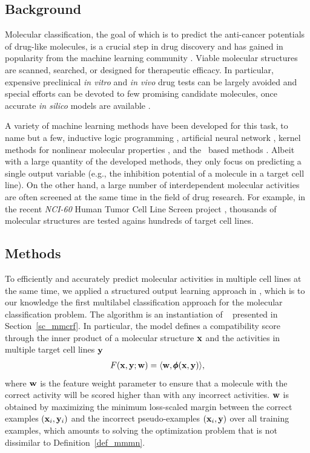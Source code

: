 {%
%
\subsection{Background}

Molecular classification, the goal of which is to predict the anti-cancer potentials of drug-like molecules, is a crucial step in drug discovery and has gained in popularity from the machine learning community \citep{Singh12qsar,Dutt12classification}.
Viable molecular structures are scanned, searched, or designed for therapeutic efficacy.
In particular, expensive preclinical \textit{in vitro} and \textit{in vivo} drug tests can be largely avoided and special efforts can be devoted to few promising candidate molecules, once accurate \textit{in silico} models are available \citep{Burbidg01drug}.

A variety of machine learning methods have been developed for this task, to name but a few, inductive logic programming \citep{King96structure}, artificial neural network \citep{Bernazzani06predicting}, kernel methods for nonlinear molecular properties \citep{Trotter01drug,Ralaivola05graph,Swamidass05kernel,Ceroni07classification}, and the \svm\ based methods \citep{Trotter01drug,Byvatov03comparison,Xue04effect}.
Albeit with a large quantity of the developed methods, they only focus on predicting a single output variable (e.g., the inhibition potential of a molecule in a target cell line). 
On the other hand, a large number of interdependent molecular activities are often screened at the same time in the field of drug research.
For example, in the recent \textit{NCI-60} {Human Tumor Cell Line Screen} project \citep{Shoemaker06the}, thousands of molecular structures are tested agains hundreds of target cell lines.



%
%
\subsection{Methods}

To efficiently and accurately predict molecular activities in multiple cell lines at the same time, we applied a structured output learning approach in , which is to our knowledge the first multilabel classification approach for the molecular classification problem.
The algorithm is an instantiation of \mmcrf\ \citep{Rousu07} presented in Section~\ref{sc_mmcrf}.
In particular, the model defines a compatibility score through the inner product of a molecular structure $\mathbf {x}$ and the activities in multiple target cell lines $\mathbf {y}$
\begin{align*}
	F(\mathbf {x},\mathbf {y};\mathbf {w}) = \langle \mathbf {w}, \pmb \phi(\mathbf {x},\mathbf {y}) \rangle,
\end{align*}
where $\mathbf {w}$ is the feature weight parameter to ensure that a molecule with the correct activity will be scored higher than with any incorrect activities.
$\mathbf {w}$ is obtained by maximizing the minimum loss-scaled margin between the correct examples $(\mathbf {x}_i,\mathbf {y}_i)$ and the incorrect pseudo-examples $(\mathbf {x}_i,\mathbf {y})$ over all training examples, which amounts to solving the optimization problem that is not dissimilar to Definition~\ref{def_mmmn}.

}
